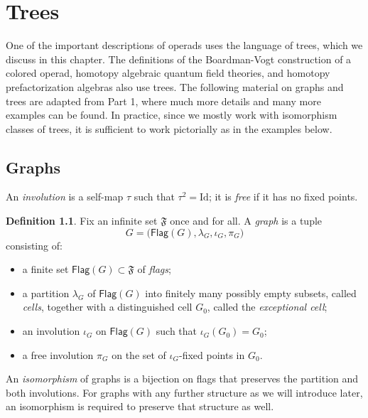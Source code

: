 \documentclass[11pt]{amsbook}
\numberwithin{section}{chapter}
\numberwithin{subsection}{section}
\numberwithin{equation}{section}
\theoremstyle{plain}
\theoremstyle{definition}
\newtheorem{definition}[equation]{Definition}
\newcommand{\Flag}{\mathsf{Flag}}
\newcommand{\Id}{\mathrm{Id}}
\begin{document}
\chapter{Trees}\label{ch:tree}

One of the important descriptions of operads uses the language of trees, which we discuss in this chapter.  The definitions of the Boardman-Vogt construction of a colored operad, homotopy algebraic quantum field theories, and homotopy prefactorization algebras also use trees.  The following material on graphs and trees are adapted from \cite{bluemonster} Part 1, where much more details and many more examples can be found.  In practice, since we mostly work with isomorphism classes of trees, it is sufficient to work pictorially as in the examples below.

\section{Graphs}\label{sec:graphs} 

An \emph{involution} is a self-map $\tau$ such that $\tau^2 = \Id$; it is \emph{free} if it has no fixed points.

\begin{definition}\label{def:graph} Fix an infinite set $\mathfrak{F}$ once and for all.  A \emph{graph} is a tuple\label{notation:flag} \[G = \bigl(\Flag(G),\lambda_G,\iota_G,\pi_G\bigr)\] consisting of:
\begin{itemize}\item a finite set $\Flag(G) \subset \mathfrak{F}$ of \emph{flags};
\item a partition  $\lambda_G$ of $\Flag(G)$ into finitely many possibly empty subsets, called \emph{cells}, together with a distinguished cell $G_0$, called the \emph{exceptional cell};
\item an involution $\iota_G$ on $\Flag(G)$ such that $\iota_G(G_0)=G_0$;
\item a free involution $\pi_G$ on the set of $\iota_G$-fixed points in $G_0$.
\end{itemize}
An \emph{isomorphism} of graphs is a bijection on flags that preserves the partition and both involutions.  For graphs with any further structure as we will introduce later, an isomorphism is required to preserve that structure as well.
\end{definition}
\end{document}
